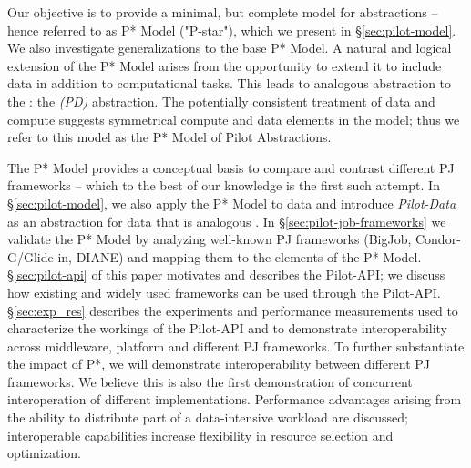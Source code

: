 \documentclass[conference]{IEEEtran}
\begin{document}



Our objective is to provide a minimal, but complete model for \pilot
abstractions -- hence referred to as P* Model ("P-star"), which we
present in \S\ref{sec:pilot-model}.  We also investigate
generalizations to the base P* Model.  A natural and logical extension
of the P* Model arises from the opportunity to extend it to include
data in addition to computational tasks. This leads to analogous
abstraction to the \pilotjob: the \emph{\pilotdata (PD)}
abstraction. The potentially consistent treatment of data and compute
suggests symmetrical compute and data elements in the model; thus we
refer to this model as the P* Model of Pilot Abstractions.

The P* Model provides a conceptual basis to compare and contrast
different PJ frameworks -- which to the best of our knowledge is the
first such attempt. In \S\ref{sec:pilot-model}, we also apply the P*
Model to data and introduce {\it Pilot-Data} as an abstraction for
data that is analogous \pilotjobs. In \S\ref{sec:pilot-job-frameworks}
we validate the P* Model by analyzing well-known PJ frameworks
(BigJob, Condor-G/Glide-in, DIANE) and mapping them to the elements of
the P* Model. \S\ref{sec:pilot-api} of this paper motivates and
describes the Pilot-API; we discuss how existing and widely used
\pilotjob frameworks can be used through the
Pilot-API. \S\ref{sec:exp_res} describes the experiments and
performance measurements used to characterize the workings of the
Pilot-API and to demonstrate interoperability across middleware,
platform and different PJ frameworks. To further substantiate the
impact of P*, we will demonstrate interoperability between different
PJ frameworks. %
We believe this is also the first demonstration of concurrent
interoperation of different \pilotjob implementations. Performance
advantages arising from the ability to distribute part of a
data-intensive workload are discussed; interoperable capabilities
increase flexibility in resource selection and optimization.
\end{document}
